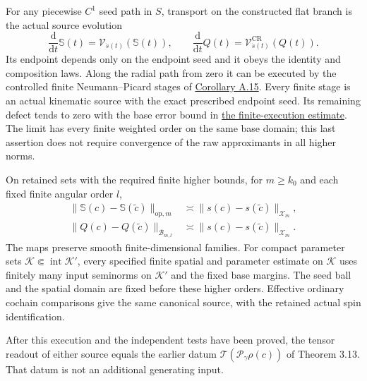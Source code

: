 \documentclass[
  english,
  11pt,
  reqno]{amsart}
\begin{document}
For any piecewise \(C^1\) seed path in \(S\), transport on the
constructed flat branch is the actual source evolution%
 \[
\frac{\mathrm d}{\mathrm dt}\mathbb S(t)=\mathscr V_{\dot s(t)}(\mathbb S(t)),
\qquad
\frac{\mathrm d}{\mathrm dt}Q(t)=\mathscr V^{\mathrm{CR}}_{\dot s(t)}(Q(t)).
\] Its endpoint depends only on the endpoint seed and it obeys the
identity and composition laws. Along the radial path from zero it can be
executed by the controlled finite Neumann--Picard stages of
\hyperref[cor:online-current-finite-neumann-picard]{Corollary A.15}.
Every finite stage is an actual kinematic source with the exact
prescribed endpoint seed. Its remaining defect tends to zero with the
base error bound in
\hyperref[eq:online-current-finite-execution-error]{the finite-execution
estimate}. The limit has every finite weighted order on the same base
domain; this last assertion does not require convergence of the raw
approximants in all higher norms.

On retained sets with the required finite higher bounds, for
\(m\ge k_0\) and each fixed finite angular order \(l\),%
\[
\begin{aligned}
\|\mathbb S(c)-\mathbb S(\widetilde c)\|_{\mathrm{op},m}
&\asymp\|s(c)-s(\widetilde c)\|_{\mathcal X_m},\\
\|Q(c)-Q(\widetilde c)\|_{\mathcal B_{m,l}}
&\asymp\|s(c)-s(\widetilde c)\|_{\mathcal X_m}.
\end{aligned}
\] The maps preserve smooth finite-dimensional families. For compact
parameter sets \(\mathcal K\Subset\operatorname{int}\mathcal K'\), every
specified finite spatial and parameter estimate on \(\mathcal K\) uses
finitely many input seminorms on \(\mathcal K'\) and the fixed base
margins. The seed ball and the spatial domain are fixed before these
higher orders. Effective ordinary cochain comparisons give the same
canonical source, with the retained actual spin identification.

After this execution and the independent tests have been proved, the
tensor readout of either source equals the earlier datum
\(\mathcal T(\mathscr P_\gamma\rho(c))\) of Theorem 3.13. That datum is
not an additional generating input.
\end{document}
